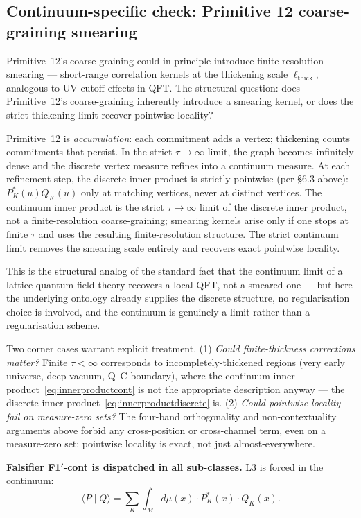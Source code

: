 \documentclass[11pt,a4paper]{article}
\begin{document}
\subsection{Continuum-specific check: Primitive 12 coarse-graining smearing}

Primitive~12's coarse-graining could in principle introduce finite-resolution smearing --- short-range correlation kernels at the thickening scale $\ell_\mathrm{thick}$, analogous to UV-cutoff effects in QFT. The structural question: does Primitive~12's coarse-graining inherently introduce a smearing kernel, or does the strict thickening limit recover pointwise locality?

Primitive~12 is \emph{accumulation}: each commitment adds a vertex; thickening counts commitments that persist. In the strict $\tau \to \infty$ limit, the graph becomes infinitely dense and the discrete vertex measure refines into a continuum measure. At each refinement step, the discrete inner product is strictly pointwise (per \S 6.3 above): $P_K^*(u) Q_K(u)$ only at matching vertices, never at distinct vertices. The continuum inner product is the strict $\tau \to \infty$ limit of the discrete inner product, not a finite-resolution coarse-graining; smearing kernels arise only if one stops at finite $\tau$ and uses the resulting finite-resolution structure. The strict continuum limit removes the smearing scale entirely and recovers exact pointwise locality.

This is the structural analog of the standard fact that the continuum limit of a lattice quantum field theory recovers a local QFT, not a smeared one --- but here the underlying ontology already supplies the discrete structure, no regularisation choice is involved, and the continuum is genuinely a limit rather than a regularisation scheme.

Two corner cases warrant explicit treatment. (1) \emph{Could finite-thickness corrections matter?} Finite $\tau < \infty$ corresponds to incompletely-thickened regions (very early universe, deep vacuum, Q--C boundary), where the continuum inner product~\eqref{eq:innerproductcont} is not the appropriate description anyway --- the discrete inner product~\eqref{eq:innerproductdiscrete} is. (2) \emph{Could pointwise locality fail on measure-zero sets?} The four-band orthogonality and non-contextuality arguments above forbid any cross-position or cross-channel term, even on a measure-zero set; pointwise locality is exact, not just almost-everywhere.

\textbf{Falsifier F1$'$-cont is dispatched in all sub-classes.} L3 is forced in the continuum:
\begin{equation}
\langle P \mid Q \rangle = \sum_K \int_M d\mu(x) \cdot P_K^*(x) \cdot Q_K(x).
\label{eq:l3result}
\end{equation}
\end{document}
